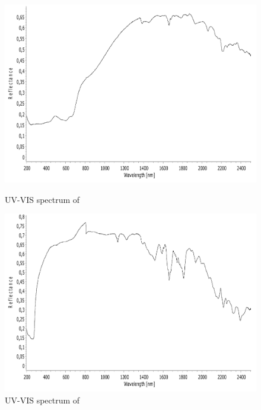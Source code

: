 \begin{figure}[!htpb]
\centering
\includegraphics[scale=0.43]{figures/CuR4HOMP-VIS.pdf}
\caption*{UV-VIS spectrum of }
\label{fig:CuR4HOMP_vis}
\includegraphics[scale=0.43]{figures/ZnR4HOMP-VIS.pdf}
\caption*{UV-VIS spectrum of }
\label{fig:ZnR4HOMP_vis}
\end{figure}